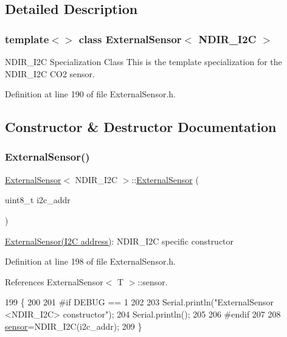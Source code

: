 \subsection{Detailed Description}
\subsubsection*{template$<$$>$\newline
class External\+Sensor$<$ N\+D\+I\+R\+\_\+\+I2\+C $>$}

N\+D\+I\+R\+\_\+\+I2C Specialization Class This is the template specialization for the N\+D\+I\+R\+\_\+\+I2C C\+O2 sensor. 

Definition at line 190 of file External\+Sensor.\+h.



\subsection{Constructor \& Destructor Documentation}
\mbox{\label{classExternalSensor_3_01NDIR__I2C_01_4_aa06970ea689679c0e1deb5360e05a0a4}} 
\subsubsection{\texorpdfstring{External\+Sensor()}{ExternalSensor()}}
{\footnotesize\ttfamily \hyperlink{classExternalSensor}{External\+Sensor}$<$ N\+D\+I\+R\+\_\+\+I2C $>$\+::\hyperlink{classExternalSensor}{External\+Sensor} (\begin{DoxyParamCaption}\item[{uint8\+\_\+t}]{i2c\+\_\+addr }\end{DoxyParamCaption})\hspace{0.3cm}{\ttfamily [inline]}}

\hyperlink{classExternalSensor}{External\+Sensor(\+I2\+C address)}\+: N\+D\+I\+R\+\_\+\+I2C specific constructor 

Definition at line 198 of file External\+Sensor.\+h.



References External\+Sensor$<$ T $>$\+::sensor.


\begin{DoxyCode}
199     \{
200     
201 \textcolor{preprocessor}{    #if DEBUG == 1 }
202 
203         Serial.println(\textcolor{stringliteral}{"ExternalSensor <NDIR\_I2C> constructor"});
204         Serial.println();
205     
206 \textcolor{preprocessor}{    #endif}
207 
208         \hyperlink{classExternalSensor_3_01NDIR__I2C_01_4_ae541c9cece7c38674b70114cdb74a7dc}{sensor}=NDIR\_I2C(i2c\_addr);
209     \}
\end{DoxyCode}


